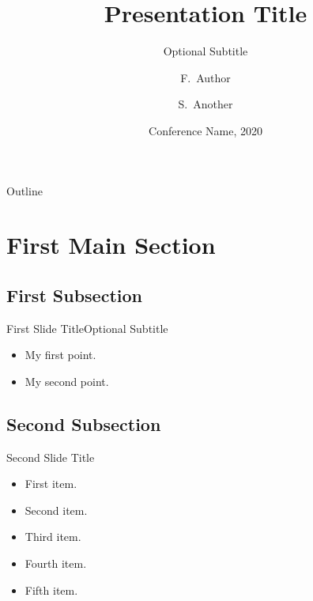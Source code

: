 \documentclass[
  UTF8, %
  aspectratio=43, %
]{presentation}
\title{Presentation Title}
\subtitle{Optional Subtitle}
\author{F.~Author\inst{1} \and S.~Another\inst{2}}
\institute[Universities of Somewhere and Elsewhere] %
{
  \inst{1}
  Department of Computer Science \\
  University of Somewhere
  \and
  \inst{2}
  Department of Theoretical Philosophy \\
  University of Elsewhere
}
\date{Conference Name, 2020}
\begin{document}
\begin{frame}
  \titlepage
\end{frame}

\begin{frame}{Outline}
  \tableofcontents
\end{frame}


\section{First Main Section}

\subsection{First Subsection}

\begin{frame}{First Slide Title}{Optional Subtitle}
  \begin{itemize}
    \item {
          My first point.
          }
    \item {
          My second point.
          }
  \end{itemize}
\end{frame}

\subsection{Second Subsection}

\begin{frame}{Second Slide Title}
  \begin{itemize}
    \item {
          First item.
          \pause %
          }
    \item {
          Second item.
          }
    \item<3-> {
          Third item.
          }
    \item<4-> {
          Fourth item.
          }
    \item<5-> {
          Fifth item. 
          }
  \end{itemize}
\end{frame}
\end{document}
